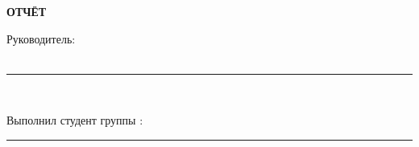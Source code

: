 \begin{titlepage}
\thispagestyle{empty}
\singlespacing
\setlength{\parindent}{0pt}

\begin{center}

\vspace{0.3cm}
\hseProgram
\end{center}

\vfill

\begin{center}
\textbf{ОТЧЁТ}\\[0.3cm]
\textbf{\hseProjectName}
\end{center}

\vfill

\begin{flushright}
\begin{minipage}{0.55\textwidth}
\raggedright
Руководитель:\\
\hseSupervisorTitle\\
\rule{3cm}{0.4pt}~\hseSupervisorName

\vspace{0.8cm}
Выполнил студент группы \hseGroup:\\
\rule{3cm}{0.4pt}~\hseAuthorName
\end{minipage}
\end{flushright}

\vfill

\begin{center}
\hseYear
\end{center}
\end{titlepage}
\setcounter{page}{2}
